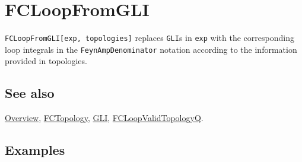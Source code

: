 \documentclass[../FeynCalcManual.tex]{subfiles}
\begin{document}
\hypertarget{fcloopfromgli}{
\section{FCLoopFromGLI}\label{fcloopfromgli}}

\texttt{FCLoopFromGLI[\allowbreak{}exp,\ \allowbreak{}topologies]}
replaces \texttt{GLI}s in \texttt{exp} with the corresponding loop
integrals in the \texttt{FeynAmpDenominator} notation according to the
information provided in topologies.

\subsection{See also}

\hyperlink{toc}{Overview}, \hyperlink{fctopology}{FCTopology},
\hyperlink{gli}{GLI},
\hyperlink{fcloopvalidtopologyq}{FCLoopValidTopologyQ}.

\subsection{Examples}

\begin{Shaded}
\begin{Highlighting}[]
\ExtensionTok{=} \OperatorTok{\{}
\OperatorTok{[}\OperatorTok{,} \OperatorTok{\{}\OperatorTok{[\{}\OperatorTok{,}\OperatorTok{\}],}\OperatorTok{[\{} \SpecialCharTok{+}\OperatorTok{,}\OperatorTok{\}],}\OperatorTok{[\{} \SpecialCharTok{+}\OperatorTok{,}\OperatorTok{\}],}\OperatorTok{[\{} \SpecialCharTok{+}\OperatorTok{,}\OperatorTok{\}]\},} 
    \OperatorTok{\{}\OperatorTok{\},} \OperatorTok{\{}\OperatorTok{,}\OperatorTok{,}\OperatorTok{\},} \OperatorTok{\{\},} \OperatorTok{\{\}],} 
\OperatorTok{[}\OperatorTok{,} \OperatorTok{\{}\OperatorTok{[\{}\OperatorTok{,}\OperatorTok{\}],}\OperatorTok{[\{}\OperatorTok{,}\OperatorTok{\}],}\OperatorTok{[\{}\SpecialCharTok{{-}}\OperatorTok{,} \OperatorTok{\}]\},} \OperatorTok{\{}\OperatorTok{,}\OperatorTok{\},} \OperatorTok{\{\},} \OperatorTok{\{\},} \OperatorTok{\{\}]\}}
\end{Highlighting}
\end{Shaded}
\end{document}
